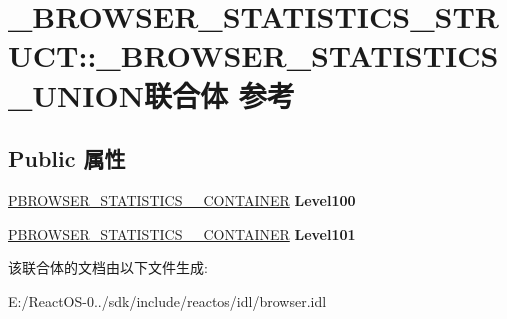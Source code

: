 \hypertarget{union___b_r_o_w_s_e_r___s_t_a_t_i_s_t_i_c_s___s_t_r_u_c_t_1_1___b_r_o_w_s_e_r___s_t_a_t_i_s_t_i_c_s___u_n_i_o_n}{}\section{\+\_\+\+B\+R\+O\+W\+S\+E\+R\+\_\+\+S\+T\+A\+T\+I\+S\+T\+I\+C\+S\+\_\+\+S\+T\+R\+U\+CT\+:\+:\+\_\+\+B\+R\+O\+W\+S\+E\+R\+\_\+\+S\+T\+A\+T\+I\+S\+T\+I\+C\+S\+\_\+\+U\+N\+I\+O\+N联合体 参考}
\label{union___b_r_o_w_s_e_r___s_t_a_t_i_s_t_i_c_s___s_t_r_u_c_t_1_1___b_r_o_w_s_e_r___s_t_a_t_i_s_t_i_c_s___u_n_i_o_n}
\subsection*{Public 属性}
\begin{DoxyCompactItemize}
\item 
\mbox{\label{union___b_r_o_w_s_e_r___s_t_a_t_i_s_t_i_c_s___s_t_r_u_c_t_1_1___b_r_o_w_s_e_r___s_t_a_t_i_s_t_i_c_s___u_n_i_o_n_a11bf65d5805880573e6f632251e00680}} 
\hyperlink{struct___b_r_o_w_s_e_r___s_t_a_t_i_s_t_i_c_s__100___c_o_n_t_a_i_n_e_r}{P\+B\+R\+O\+W\+S\+E\+R\+\_\+\+S\+T\+A\+T\+I\+S\+T\+I\+C\+S\+\_\+\_\+\+C\+O\+N\+T\+A\+I\+N\+ER} {\bfseries Level100}
\item 
\mbox{\label{union___b_r_o_w_s_e_r___s_t_a_t_i_s_t_i_c_s___s_t_r_u_c_t_1_1___b_r_o_w_s_e_r___s_t_a_t_i_s_t_i_c_s___u_n_i_o_n_a6cbbccef725380881a1d4c9c32a390cb}} 
\hyperlink{struct___b_r_o_w_s_e_r___s_t_a_t_i_s_t_i_c_s__101___c_o_n_t_a_i_n_e_r}{P\+B\+R\+O\+W\+S\+E\+R\+\_\+\+S\+T\+A\+T\+I\+S\+T\+I\+C\+S\+\_\+\_\+\+C\+O\+N\+T\+A\+I\+N\+ER} {\bfseries Level101}
\end{DoxyCompactItemize}


该联合体的文档由以下文件生成\+:\begin{DoxyCompactItemize}
\item 
E\+:/\+React\+O\+S-\/0../sdk/include/reactos/idl/browser.\+idl\end{DoxyCompactItemize}
